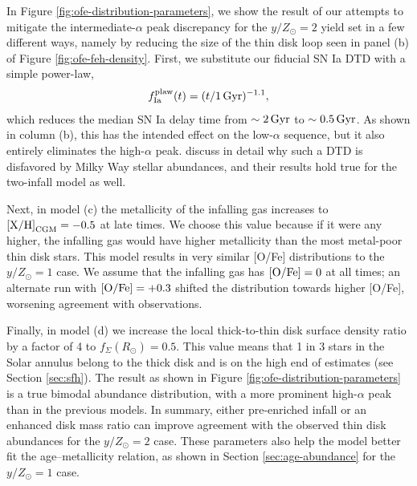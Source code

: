 \documentclass[twocolumn,twocolappendix,linenumbers]{aastex631}
\newcommand{\mathXH}{{\rm [X/H]}}
\newcommand{\mathOFe}{{\rm [O/Fe]}}
\newcommand{\yZ}[1]{$y/Z_\odot=#1$}
\begin{document}
In Figure \ref{fig:ofe-distribution-parameters}, we show the result of our attempts to mitigate the intermediate-$\alpha$ peak discrepancy for the \yZ{2} yield set in a few different ways, namely by reducing the size of the thin disk loop seen in panel (b) of Figure \ref{fig:ofe-feh-density}. First, we substitute our fiducial SN Ia DTD with a simple power-law,
\begin{equation}
    f_{\rm Ia}^{\rm plaw}(t) = (t/1\,\rm{Gyr})^{-1.1},
    \label{eq:powerlaw-dtd}
\end{equation}
which reduces the median SN Ia delay time from $\sim2\,{\rm Gyr}$ to $\sim0.5\,{\rm Gyr}$. As shown in column (b), this has the intended effect on the low-$\alpha$ sequence, but it also entirely eliminates the high-$\alpha$ peak. \citet{dubay_galactic_2024} discuss in detail why such a DTD is disfavored by Milky Way stellar abundances, and their results hold true for the two-infall model as well.

Next, in model (c) the metallicity of the infalling gas increases to $\mathXH_{\rm CGM}=-0.5$ at late times. We choose this value because if it were any higher, the infalling gas would have higher metallicity than the most metal-poor thin disk stars. This model results in very similar [O/Fe] distributions to the $y/Z_\odot=1$ case. We assume that the infalling gas has $\mathOFe=0$ at all times; an alternate run with $\mathOFe=+0.3$ shifted the distribution towards higher [O/Fe], worsening agreement with observations. 

Finally, in model (d) we increase the local thick-to-thin disk surface density ratio by a factor of 4 to $f_\Sigma(R_\odot)=0.5$. This value means that 1 in 3 stars in the Solar annulus belong to the thick disk and is on the high end of estimates (see Section \ref{sec:sfh}). The result as shown in Figure \ref{fig:ofe-distribution-parameters} is a true bimodal abundance distribution, with a more prominent high-$\alpha$ peak than in the previous models. In summary, either pre-enriched infall or an enhanced disk mass ratio can improve agreement with the observed thin disk abundances for the \yZ{2} case. These parameters also help the model better fit the age--metallicity relation, as shown in Section \ref{sec:age-abundance} for the \yZ{1} case.
\end{document}
